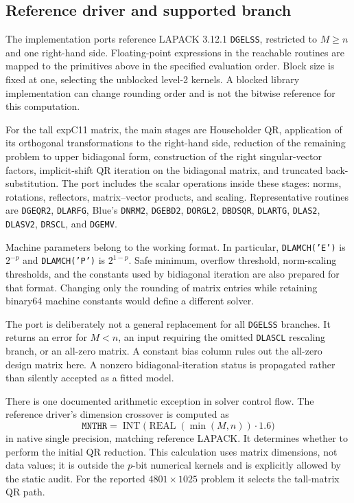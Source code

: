 \documentclass[11pt]{article}
\newcommand{\code}[1]{\texttt{#1}}
\begin{document}
\subsection{Reference driver and supported branch}
The implementation ports reference LAPACK 3.12.1 \code{DGELSS}, restricted
to $M\ge n$ and one right-hand side. Floating-point expressions in the
reachable routines are mapped to the primitives above in the specified
evaluation order. Block size is fixed at one, selecting the unblocked
level-2 kernels. A blocked library implementation can change rounding order
and is not the bitwise reference for this computation.

For the tall expC11 matrix, the main stages are Householder QR, application
of its orthogonal transformations to the right-hand side, reduction of the
remaining problem to upper bidiagonal form, construction of the right
singular-vector factors, implicit-shift QR iteration on the bidiagonal matrix,
and truncated back-substitution. The port includes the scalar operations
inside these stages: norms, rotations, reflectors, matrix--vector products,
and scaling. Representative routines are \code{DGEQR2}, \code{DLARFG},
Blue's \code{DNRM2}, \code{DGEBD2}, \code{DORGL2}, \code{DBDSQR},
\code{DLARTG}, \code{DLAS2}, \code{DLASV2}, \code{DRSCL}, and
\code{DGEMV}.

Machine parameters belong to the working format. In particular,
\code{DLAMCH('E')} is $2^{-p}$ and \code{DLAMCH('P')} is $2^{1-p}$.
Safe minimum, overflow threshold, norm-scaling thresholds, and the constants
used by bidiagonal iteration are also prepared for that format. Changing only
the rounding of matrix entries while retaining binary64 machine constants
would define a different solver.

The port is deliberately not a general replacement for all \code{DGELSS}
branches. It returns an error for $M<n$, an input requiring the omitted
\code{DLASCL} rescaling branch, or an all-zero matrix. A constant bias column
rules out the all-zero design matrix here. A nonzero bidiagonal-iteration
status is propagated rather than silently accepted as a fitted model.

There is one documented arithmetic exception in solver control flow. The
reference driver's dimension crossover is computed as
\[
 \code{MNTHR}=\operatorname{INT}
       \bigl(\operatorname{REAL}(\min(M,n))\cdot1.6\bigr)
\]
in native single precision, matching reference LAPACK. It determines whether
to perform the initial QR reduction. This calculation uses matrix dimensions,
not data values; it is outside the $p$-bit numerical kernels and is explicitly
allowed by the static audit. For the reported $4801\times1025$ problem it
selects the tall-matrix QR path.
\end{document}
